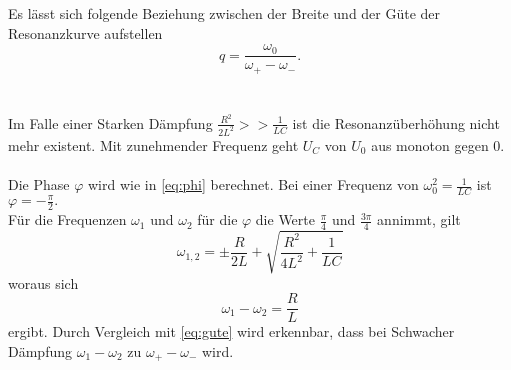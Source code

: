 Es lässt sich folgende Beziehung zwischen der Breite und der Güte der Resonanzkurve aufstellen
\begin{equation*}
    q = \frac{ω_0}{ω_+ - ω_-}.
\end{equation*}\\
\\
Im Falle einer Starken Dämpfung $\frac{R^2}{2L^2} >> \frac{1}{LC}$ ist die Resonanzüberhöhung nicht mehr existent.
Mit zunehmender Frequenz geht $U_C$ von $U_0$ aus monoton gegen $0.$\\
\\
Die Phase $φ$ wird wie in \eqref{eq:phi} berechnet. Bei einer Frequenz von $ω_0^2 = \frac{1}{LC}$ ist $φ = -\frac{\pi}{2}.$\\
Für die Frequenzen $ω_1$ und $ω_2$ für die $φ$ die Werte $\frac{\pi}{4}$ und $\frac{3\pi}{4}$ annimmt, gilt
\begin{equation}\label{eq:w12}
    ω_{1,2} = \pm \frac{R}{2L} + \sqrt{\frac{R^2}{4L^2} + \frac{1}{LC}}
\end{equation}
woraus sich
\begin{equation*}
    ω_1 - ω_2 = \frac{R}{L}
\end{equation*}
ergibt. Durch Vergleich mit \eqref{eq:gute} wird erkennbar, dass bei Schwacher Dämpfung $ω_1 - ω_2$ zu $ω_+ - ω_-$ wird.
